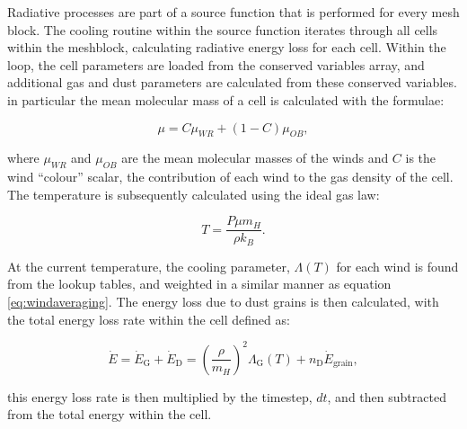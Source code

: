 Radiative processes are part of a source function that is performed for every mesh block.
The cooling routine within the source function iterates through all cells within the meshblock, calculating radiative energy loss for each cell.
Within the loop, the cell parameters are loaded from the conserved variables array, and additional gas and dust parameters are calculated from these conserved variables.
in particular the mean molecular mass of a cell is calculated with the formulae:

\begin{equation}
  \mu = C\mu_{WR} + (1-C) \mu_{OB}, \label{eq:windaveraging}
\end{equation}

\noindent
where $\mu_{WR}$ and $\mu_{OB}$ are the mean molecular masses of the winds and $C$ is the wind ``colour'' scalar, the contribution of each wind to the gas density of the cell.
The temperature is subsequently calculated using the ideal gas law:

\begin{equation}
  T = \frac{P \mu m_H}{\rho k_B}.
\end{equation}

\noindent
At the current temperature, the cooling parameter, $\Lambda(T)$ for each wind is found from the lookup tables, and weighted in a similar manner as equation \ref{eq:windaveraging}. The energy loss due to dust grains is then calculated, with the total energy loss rate within the cell defined as:

\begin{equation}
  \dot E = \dot{E}_\text{G} + \dot{E}_\text{D} = \left(\frac{\rho}{m_H}\right)^2 \Lambda_\text{G}(T) + n_\text{D} \dot{E}_\text{grain},
\end{equation}

\noindent
this energy loss rate is then multiplied by the timestep, $dt$, and then subtracted from the total energy within the cell. 


